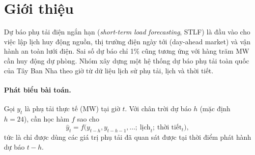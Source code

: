 \section{Giới thiệu}\label{sec:intro}
Dự báo phụ tải điện ngắn hạn (\emph{short-term load forecasting}, STLF) là đầu vào cho việc lập lịch
huy động nguồn, thị trường điện ngày tới (day-ahead market) và vận hành an toàn lưới điện. Sai số dự báo
chỉ 1\% cũng tương ứng với hàng trăm MW cần huy động dự phòng. Nhóm xây dựng một hệ thống dự báo phụ tải
toàn quốc của Tây Ban Nha theo giờ từ dữ liệu lịch sử phụ tải, lịch và thời tiết.

\paragraph{Phát biểu bài toán.} Gọi $y_t$ là phụ tải thực tế (MW) tại giờ $t$. Với chân trời dự báo
$h$ (mặc định $h=24$), cần học hàm $f$ sao cho
\begin{equation}
  \hat{y}_t = f\bigl(y_{t-h}, y_{t-h-1}, \dots;\ \text{lịch}_t;\ \text{thời tiết}_t\bigr),
\end{equation}
tức là chỉ được dùng các giá trị phụ tải đã quan sát được tại thời điểm phát hành dự báo $t-h$.

